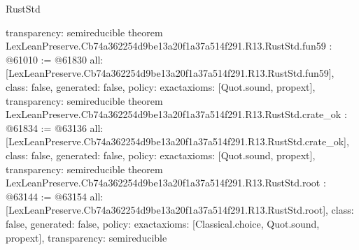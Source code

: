 \begin{lexlean}{RustStd}
\begin{coremodule}
{  transparency: semireducible
}
theorem LexLeanPreserve.Cb74a362254d9be13a20f1a37a514f291.R13.RustStd.fun59 : @61010 := @61830 {
  all: [LexLeanPreserve.Cb74a362254d9be13a20f1a37a514f291.R13.RustStd.fun59],
  class: false,
  generated: false,
  policy: exact{axioms: [Quot.sound, propext]},
  transparency: semireducible
}
theorem LexLeanPreserve.Cb74a362254d9be13a20f1a37a514f291.R13.RustStd.crate_ok : @61834 := @63136 {
  all: [LexLeanPreserve.Cb74a362254d9be13a20f1a37a514f291.R13.RustStd.crate_ok],
  class: false,
  generated: false,
  policy: exact{axioms: [Quot.sound, propext]},
  transparency: semireducible
}
theorem LexLeanPreserve.Cb74a362254d9be13a20f1a37a514f291.R13.RustStd.root : @63144 := @63154 {
  all: [LexLeanPreserve.Cb74a362254d9be13a20f1a37a514f291.R13.RustStd.root],
  class: false,
  generated: false,
  policy: exact{axioms: [Classical.choice, Quot.sound, propext]},
  transparency: semireducible
}


\end{coremodule}
\end{lexlean}
